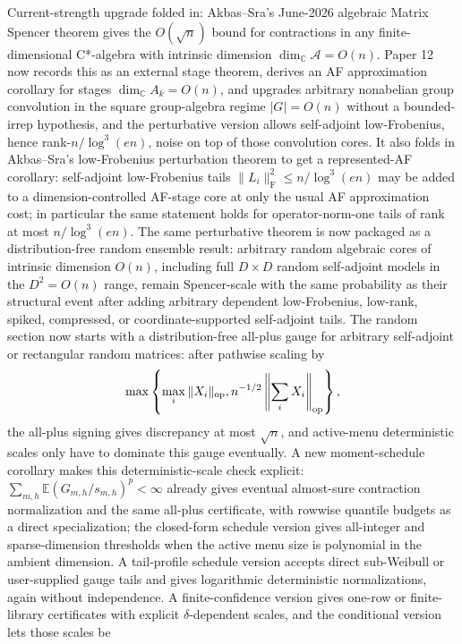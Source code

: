 \documentclass[11pt]{article}
\begin{document}
Current-strength upgrade folded in: Akbas--Sra's June-2026 algebraic Matrix
Spencer theorem gives the \(O(\sqrt n)\) bound for contractions in any
finite-dimensional C*-algebra with intrinsic dimension
\(\dim_{\mathbb C}\mathcal A=O(n)\).  Paper 12 now records this as an external
stage theorem, derives an AF approximation corollary for stages
\(\dim_{\mathbb C}A_k=O(n)\), and upgrades arbitrary nonabelian group
convolution in the square group-algebra regime \(|G|=O(n)\) without a
bounded-irrep hypothesis, and the perturbative version allows self-adjoint
low-Frobenius, hence rank-\(n/\log^3(en)\), noise on top of those convolution
cores.  It also folds in Akbas--Sra's low-Frobenius
perturbation theorem to get a represented-AF corollary: self-adjoint
low-Frobenius tails
\(\|L_i\|_{\mathrm F}^2\le n/\log^3(en)\) may be added to a dimension-controlled
AF-stage core at only the usual AF approximation cost; in particular the same
statement holds for operator-norm-one tails of rank at most
\(n/\log^3(en)\).  The same perturbative theorem is now packaged as a
distribution-free random ensemble result: arbitrary random algebraic cores of
intrinsic dimension \(O(n)\), including full \(D\times D\) random self-adjoint
models in the \(D^2=O(n)\) range, remain Spencer-scale with the same probability
as their structural event after adding arbitrary dependent low-Frobenius,
low-rank, spiked, compressed, or coordinate-supported self-adjoint tails.  The
random section now starts with a distribution-free all-plus gauge for arbitrary
self-adjoint or rectangular random matrices: after pathwise scaling by
\[
  \max\left\{\max_i\|X_i\|_{\rm op},
  n^{-1/2}\left\|\sum_iX_i\right\|_{\rm op}\right\},
\]
the all-plus signing gives discrepancy at most \(\sqrt n\), and active-menu
deterministic scales only have to dominate this gauge eventually.  A new
moment-schedule corollary makes this deterministic-scale check explicit:
\(\sum_{m,h}\mathbb E(G_{m,h}/s_{m,h})^p<\infty\) already gives eventual
almost-sure contraction normalization and the same all-plus certificate, with
rowwise quantile budgets as a direct specialization; the closed-form schedule
version gives all-integer and sparse-dimension thresholds when the active menu
size is polynomial in the ambient dimension.  A tail-profile schedule version
accepts direct sub-Weibull or user-supplied gauge tails and gives logarithmic
deterministic normalizations, again without independence.  A finite-confidence
version gives one-row or finite-library certificates with explicit
\(\delta\)-dependent scales, and the conditional version lets those scales be
\end{document}
